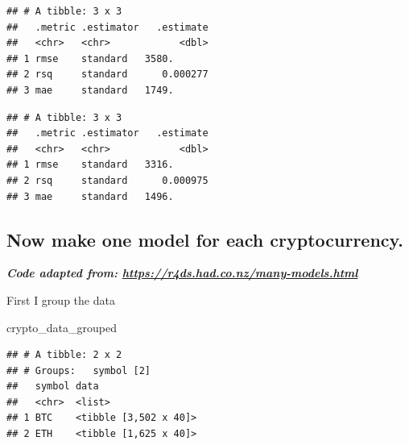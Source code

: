 \documentclass[
]{book}
\newenvironment{Shaded}{\begin{snugshade}}{\end{snugshade}}
\newcommand{\DataTypeTok}[1]{\textcolor[rgb]{0.13,0.29,0.53}{#1}}
\newcommand{\KeywordTok}[1]{\textcolor[rgb]{0.13,0.29,0.53}{\textbf{#1}}}
\newcommand{\NormalTok}[1]{#1}
\newcommand{\OperatorTok}[1]{\textcolor[rgb]{0.81,0.36,0.00}{\textbf{#1}}}
\newcommand{\StringTok}[1]{\textcolor[rgb]{0.31,0.60,0.02}{#1}}
\begin{document}
\begin{verbatim}
## # A tibble: 3 x 3
##   .metric .estimator   .estimate
##   <chr>   <chr>            <dbl>
## 1 rmse    standard   3580.      
## 2 rsq     standard      0.000277
## 3 mae     standard   1749.
\end{verbatim}

\begin{Shaded}
\end{Shaded}

\begin{verbatim}
## # A tibble: 3 x 3
##   .metric .estimator   .estimate
##   <chr>   <chr>            <dbl>
## 1 rmse    standard   3316.      
## 2 rsq     standard      0.000975
## 3 mae     standard   1496.
\end{verbatim}

\hypertarget{now-make-one-model-for-each-cryptocurrency.}{%
\subsection{Now make one model for each cryptocurrency.}\label{now-make-one-model-for-each-cryptocurrency.}}

\textbf{\emph{Code adapted from: \url{https://r4ds.had.co.nz/many-models.html}}}

First I group the data

\begin{Shaded}
\end{Shaded}

\begin{Shaded}
\begin{Highlighting}[]
\NormalTok{crypto_data_grouped}
\end{Highlighting}
\end{Shaded}

\begin{verbatim}
## # A tibble: 2 x 2
## # Groups:   symbol [2]
##   symbol data                 
##   <chr>  <list>               
## 1 BTC    <tibble [3,502 x 40]>
## 2 ETH    <tibble [1,625 x 40]>
\end{verbatim}
\end{document}
